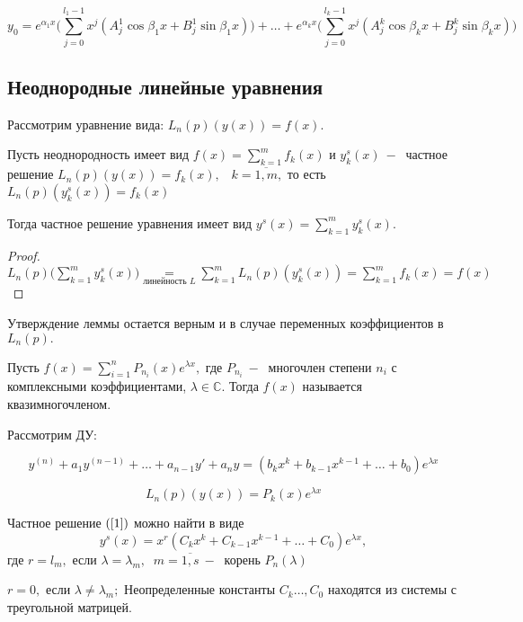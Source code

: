 \begin{equation}
    \tag{2.7}
    \label{2.7}
    y_0=e^{\alpha_1x}\Big(\displaystyle\sum_{j=0}^{l_1-1}x^j(A^1_j\cos{\beta_1x}+B^1_j\sin{\beta_1x})\Big)+\dots +e^{\alpha_kx}\Big(\displaystyle\sum_{j=0}^{l_k-1}x^j(A_j^k\cos{\beta_kx}+B_j^k\sin{\beta_kx})\Big)
\end{equation}

\subsection{Неоднородные линейные уравнения}

Рассмотрим уравнение вида: $L_n(p)(y(x))=f(x)$.

\begin{lemma}
    Пусть неоднородность имеет вид $f(x)=\displaystyle\sum_{k=1}^mf_k(x)$ и $y_k^s(x)~-~$ частное решение $L_n(p)(y(x))=f_k(x), \;\;\;k=\overline{1, m},$ то есть $L_n(p)(y^s_k(x))=f_k(x)$\par
    Тогда частное решение уравнения имеет вид $y^s(x)=\displaystyle\sum_{k=1}^my_k^s(x)$.
\end{lemma}

\begin{proof}
    $L_n(p)\Big(\displaystyle\sum_{k=1}^my_k^s(x)\Big)\underset{\text{линейность } L}{=} \displaystyle\sum_{k=1}^mL_n(p)(y^s_k(x))=\displaystyle\sum_{k=1}^mf_k(x)=f(x)$
\end{proof}

\begin{remark}
    Утверждение леммы остается верным и в случае переменных коэффициентов в $L_n(p).$
\end{remark}

\begin{definition}
    Пусть $f(x)=\displaystyle\sum_{i=1}^nP_{n_i}(x)e^{\lambda x},$ где $P_{n_i}~-~$ многочлен степени $n_i$ с комплексными коэффициентами, $\lambda \in \mathds{C}$. Тогда $f(x)$ называется квазимногочленом.
\end{definition}

Рассмотрим ДУ:

\begin{equation}
    \tag{1}
    \label{1}
    y^{(n)}+a_1y^{(n-1)}+\dots+ a_{n-1} y' + a_ny = (b_kx^k+b_{k-1}x^{k-1}+\dots + b_0)e^{\lambda x}
\end{equation}

\[ L_n(p)(y(x)) = P_k(x)e^{\lambda x}  \]

\begin{theorem}
    Частное решение $(\ref{1})$ можно найти в виде
    \begin{equation}
        \tag{2}
        \label{2}
        y^s(x)=x^r(C_kx^k+C_{k-1}x^{k-1}+\dots + C_0)e^{\lambda x},
    \end{equation}
    где $r=l_m,$ если $\lambda=\lambda_m, \;\;m=\overline{1, s}~-~$ корень $P_n(\lambda)$\par
    $r=0,$ если $\lambda\neq \lambda_m;$ Неопределенные константы $C_k \dots, C_0$ находятся из системы с треугольной матрицей.
\end{theorem}

